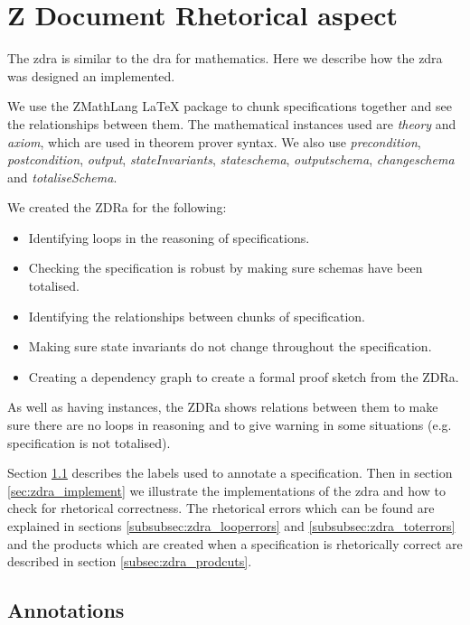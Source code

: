 \chapter{Z Document Rhetorical aspect}
\label{ch:zdra}
The \gls{zdra} is similar to the \gls{dra} for mathematics. Here we describe how the \gls{zdra} was designed an implemented. 

We use the ZMathLang \LaTeX{} package to chunk specifications together and see the relationships between them. The mathematical instances used are \textit{theory} and \textit{axiom}, which are used in theorem prover syntax. We also use \textit{precondition}, \textit{postcondition}, \textit{output}, \textit{stateInvariants}, \textit{stateschema}, \textit{outputschema}, \textit{changeschema} and \textit{totaliseSchema}.

We created the ZDRa for the following:

\begin{itemize}

\item Identifying loops in the reasoning of specifications.
\item Checking the specification is robust by making sure schemas have been totalised.
\item Identifying the relationships between chunks of specification.
\item Making sure state invariants do not change throughout the specification.
\item Creating a dependency graph to create a formal proof sketch from the ZDRa.
\end{itemize}

As well as having instances, the ZDRa shows relations between them to make sure there are no loops in reasoning and to give warning in some situations (e.g. specification is not totalised).

Section \ref{sec:zdra_annotate} describes the labels used to annotate a specification. Then in section \ref{sec:zdra_implement} we illustrate the implementations of the \gls{zdra} and how to check for rhetorical correctness. The rhetorical errors which can be found are explained in sections \ref{subsubsec:zdra_looperrors} and \ref{subsubsec:zdra_toterrors} and the products which are created when a specification is rhetorically correct are described in section \ref{subsec:zdra_prodcuts}.

\section{Annotations}
\label{sec:zdra_annotate}

